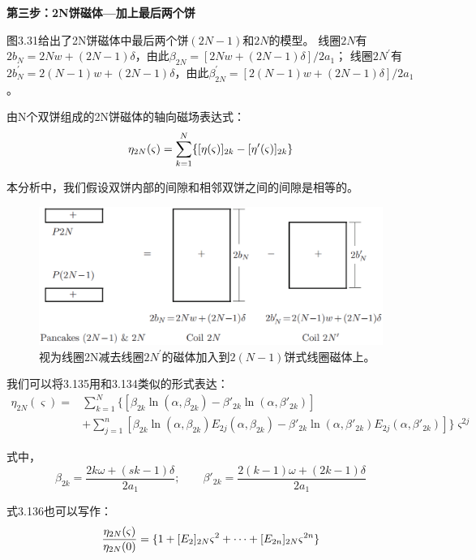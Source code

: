 \textbf{第三步：2N饼磁体---加上最后两个饼}

图3.31给出了2N饼磁体中最后两个饼$(2N−1)$和$2N$的模型。
线圈$2N$有$2b_N =2Nw+(2N−1)\delta$，由此$\beta_{2N}=[2Nw+(2N−1)\delta]/2a_1$；
线圈$2N^\prime$有$2b_N^\prime=2(N-1)w+(2N−1)\delta$，由此$\beta_{2N}^\prime=[2(N-1)w+(2N−1)\delta]/2a_1$。

由N个双饼组成的2N饼磁体的轴向磁场表达式：
\begin{equation}
\eta_{2N}(\varsigma)=\sum_{k=1}^{N}\{[\eta(\varsigma)]_{2k}-[\eta'(\varsigma)]_{2k}\}\\%
\end{equation}

本分析中，我们假设双饼内部的间隙和相邻双饼之间的间隙是相等的。
\begin{figure}[htbp]
	\centering
	\includegraphics[scale=0.4]{chpt3/figs/fig3.31.eps}
	\caption{视为线圈2N减去线圈$2N^\prime$的磁体加入到$2(N-1)$饼式线圈磁体上。}
\end{figure}

我们可以将3.135用和3.134类似的形式表达：
\begin{equation}
\begin{split}
\eta_{2N}(\varsigma)=&\sum_{k=1}^{N}\{\left[\beta_{2k}\ln(\alpha,\beta_{2k})-\beta'_{2k}\ln(\alpha,\beta'_{2k})\right]\\
&+\sum_{j=1}^{n}[\beta_{2k}\ln(\alpha,\beta_{2k})E_{2j}(\alpha,\beta_{2k})-\beta'_{2k}\ln(\alpha,\beta'_{2k})E_{2j}(\alpha,\beta'_{2k})]\}\varsigma^{2j}%
\end{split}
\end{equation}

式中，
\begin{equation*}
\beta_{2k}=\frac{2k\omega+(sk-1)\delta}{2a_1};\qquad \beta'_{2k}=\frac{2(k-1)\omega+(2k-1)\delta}{2a_{1}}
\end{equation*}

式3.136也可以写作：
\begin{equation}
\frac{\eta_{2N}(\varsigma)}{\eta_{2N}(0)}=\{1+[E_{2}]_{2N}\varsigma^2+\cdots+[E_{2n}]_{2N}\varsigma^{2n}\}\\%
\end{equation}

